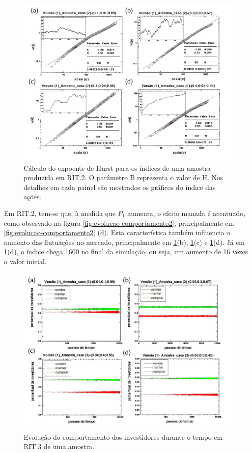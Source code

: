 \documentclass[brazil,ruledheader]{abnt}
\begin{document}
\begin{figure}[!h]
\centering
\includegraphics[width=0.8\linewidth]{Figuras/8.jpg}
 \caption[ Cálculo do expoente de Hurst para os índices em RIT.2] {Cálculo do
expoente de Hurst para os índices de uma amostra produzida em RIT.2.  O
parâmetro B representa o valor de H. Nos detalhes em cada painel são mostrados
os gráficos do índice das ações.}
\label{fig:calculo-expoente-hurst3}
\end{figure}

Em RIT.2, tem-se que, à medida que $P_1$ aumenta, o efeito manada é
acentuado,
como observado na figura \ref{fig:evolucao-comportamento2}, principalmente em
\ref{fig:evolucao-comportamento2} (d). Esta característica
também influencia o aumento das flutuações no mercado, principalmente em
\ref{fig:calculo-expoente-hurst3}(b), \ref{fig:calculo-expoente-hurst3}(c) e
\ref{fig:calculo-expoente-hurst3}(d). Já em
\ref{fig:calculo-expoente-hurst3}(d), o índice chega 1600 no final da
simulação, ou seja, um aumento de 16 vezes o valor inicial.

\begin{figure}[!h]
\centering
\includegraphics[width=0.8\linewidth]{Figuras/9.jpg}
\caption [Evolução do comportamento dos investidores em RIT.3.]{Evolução do
comportamento dos investidores durante o tempo em RIT.3 de uma amostra.}
\label{fig:evolucao-comportamento3}
\end{figure}
\end{document}
